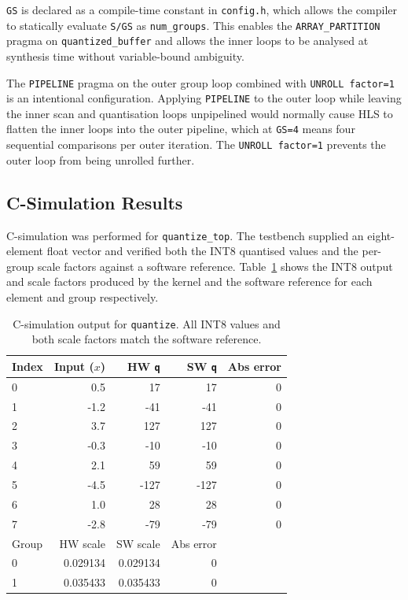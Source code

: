 \texttt{GS} is declared as a compile-time constant in \texttt{config.h},
which allows the compiler to statically evaluate \texttt{S/GS} as
\texttt{num\_groups}. This enables the \texttt{ARRAY\_PARTITION} pragma
on \texttt{quantized\_buffer} and allows the inner loops to be analysed
at synthesis time without variable-bound ambiguity.

The \texttt{PIPELINE} pragma on the outer group loop combined with
\texttt{UNROLL factor=1} is an intentional configuration. Applying
\texttt{PIPELINE} to the outer loop while leaving the inner scan and
quantisation loops unpipelined would normally cause HLS to flatten the
inner loops into the outer pipeline, which at \texttt{GS=4} means four
sequential comparisons per outer iteration. The \texttt{UNROLL factor=1}
prevents the outer loop from being unrolled further.

\subsection{C-Simulation Results}
\label{subsec:quantize_csim}

C-simulation was performed for \texttt{quantize\_top}. The testbench
supplied an eight-element float vector and verified both the INT8
quantised values and the per-group scale factors against a software
reference. Table~\ref{tab:quantize_csim} shows the INT8 output and scale factors
produced by the kernel and the software reference for each element and
group respectively.

\begin{table}[H]
  \centering
  \begin{tabular}{lrrrr}
    \toprule
    Index & Input ($x$) & HW \texttt{q} & SW \texttt{q} & Abs error \\
    \midrule
    0 &  0.5 &   17 &   17 & 0 \\
    1 & -1.2 &  -41 &  -41 & 0 \\
    2 &  3.7 &  127 &  127 & 0 \\
    3 & -0.3 &  -10 &  -10 & 0 \\
    4 &  2.1 &   59 &   59 & 0 \\
    5 & -4.5 & -127 & -127 & 0 \\
    6 &  1.0 &   28 &   28 & 0 \\
    7 & -2.8 &  -79 &  -79 & 0 \\
    \midrule
    Group & HW scale & SW scale & Abs error & \\
    \midrule
    0 & 0.029134 & 0.029134 & 0 & \\
    1 & 0.035433 & 0.035433 & 0 & \\
    \bottomrule
  \end{tabular}
  \caption{C-simulation output for \texttt{quantize}.
           All INT8 values and both scale factors match the software
           reference.}
  \label{tab:quantize_csim}

\end{table}

